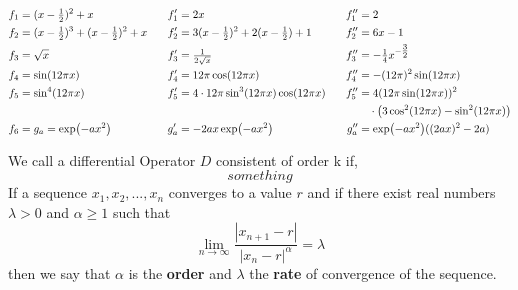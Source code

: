 \fontsize{10}{12}\selectfont
\begin{alignat*}{3}
	f_1 &=(x-\tfrac{1}{2})^2+x
		& f_1' &=2x
		& f_1'' &=2 \\
	f_2 &=(x-\tfrac{1}{2})^3+(x-\tfrac{1}{2})^2+x \hspace{0.3cm}
		& f_2' &= 3(x-\tfrac{1}{2})^2+2(x-\tfrac{1}{2})+1
		& f_2'' &= 6x-1\\
	f_3 &= \sqrt{x}
		& f_3' &=\tfrac{1}{2\sqrt{x}}
		& f_3'' &=-\tfrac{1}{4}x^{-\tfrac{3}{2}} \\
	f_4 &= \sin(12\pi x)
		& f_4' &= 12 \pi \cos(12\pi x)
		& f_4'' &= -(12\pi)^2 \sin(12\pi x)\\
	f_5 &= \sin^4(12\pi x)
		& f_5' &= 4 \cdot 12\pi \sin^3(12\pi x) \cos(12\pi x) \hspace{0.3cm}
		&  f_5'' &= 4  (12\pi \sin(12\pi x))^2 \\ & & & & &~~~\cdot\big(3\cos^2(12\pi x) - \sin^2(12\pi x) \big) \\
	f_6 &=g_a = \exp(-ax^2)
		& g_a' &= -2ax\exp(-ax^2)
		& g_a'' &= \exp(-ax^2) ((2ax)^2-2a)\\
\end{alignat*}
\fontsize{12}{14}\selectfont

We call a differential Operator $D$ consistent of order k if,
\begin{equation}
	something
\end{equation}
If a sequence $x_1,x_2,...,x_n$ converges to a value $r$ and if there exist real numbers $\lambda >0 $ and $\alpha \geq 1$ such that
\begin{equation}
	\lim_{n \to \infty} \frac{|x_{n+1}-r|}{|x_n-r|^\alpha}= \lambda
\end{equation} 
then we say that $\alpha$ is the \textbf{order} and $\lambda$ the \textbf{rate} of convergence of the sequence.


